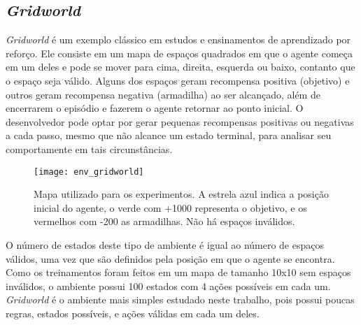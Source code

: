 \subsection{\textit{Gridworld}}
\label{sec:gridworld}

\textit{Gridworld} é um exemplo clássico em estudos e ensinamentos de aprendizado por reforço.
Ele consiste em um mapa de espaços quadrados em que o agente começa em um deles e pode se mover para cima, direita, esquerda ou baixo, contanto que o espaço seja válido.
Alguns dos espaços geram recompensa positiva (objetivo) e outros geram recompensa negativa (armadilha) ao ser alcançado, além de encerrarem o episódio e fazerem o agente retornar ao ponto inicial.
O desenvolvedor pode optar por gerar pequenas recompensas positivas ou negativas a cada passo, mesmo que não alcance um estado terminal, para analisar seu comportamente em tais circunstâncias.

\begin{figure}[h!]
  \centering
  \texttt{[image: env\_gridworld]}
  \caption{Mapa utilizado para os experimentos. A estrela azul indica a posição inicial do agente, o verde com +1000 representa o objetivo, e os vermelhos com -200 as armadilhas. Não há espaços inválidos.}
  \label{fig:env_grid}
\end{figure}

O número de estados deste tipo de ambiente é igual ao número de espaços válidos, uma vez que são definidos pela posição em que o agente se encontra.
Como os treinamentos foram feitos em um mapa de tamanho 10x10 sem espaços inválidos, o ambiente possui 100 estados com 4 ações possíveis em cada um.
\textit{Gridworld} é o ambiente mais simples estudado neste trabalho, pois possui poucas regras, estados possíveis, e ações válidas em cada um deles.

